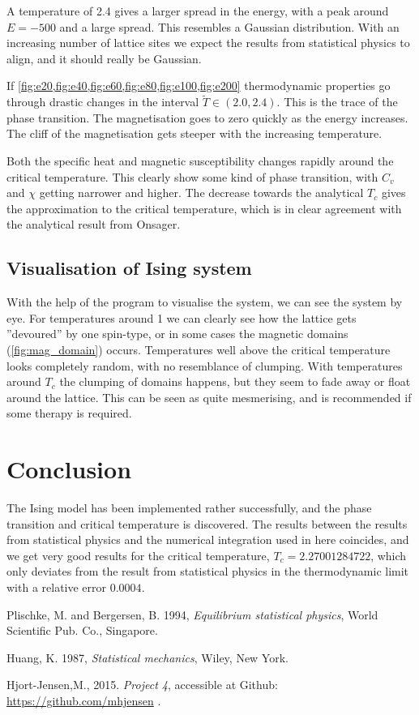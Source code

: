 \documentclass[11pt,a4paper,final]{article}
\numberwithin{equation}{section}
\begin{document}
A temperature of 2.4 gives a larger spread in the energy, with a 
peak around $E = -500$ and a large spread. This resembles a 
Gaussian distribution. With an increasing number of lattice sites 
we expect the results from statistical physics to align, and it should 
really be Gaussian.

If \cref{fig:e20,fig:e40,fig:e60,fig:e80,fig:e100,fig:e200}
thermodynamic properties go through drastic changes in the interval
$\tilde{T}\in (2.0,2.4)$. This is the trace of the phase transition.
The magnetisation goes to zero quickly as the energy increases. The 
cliff of the magnetisation gets steeper with the increasing temperature.

Both the specific heat and magnetic susceptibility changes rapidly 
around the critical temperature. This clearly show some kind of phase
transition, with $C_v$ and $\chi$ getting narrower and higher. The 
decrease towards the analytical $T_c$ gives the approximation to 
the critical temperature, which is in clear agreement with the 
analytical result from Onsager.


\subsection{Visualisation of Ising system}

With the help of the program to visualise the system, we can see the 
system by eye. For temperatures around 1 we can clearly see how the 
lattice gets ''devoured'' by one spin-type, or in some cases the 
magnetic domains (\ref{fig:mag_domain}) occurs. Temperatures well 
above the critical temperature looks completely random, with no 
resemblance of clumping. With temperatures around $T_c$ the clumping 
of domains happens, but they seem to fade away or float around the 
lattice. This can be seen as quite mesmerising, and is recommended 
if some therapy is required.

\section{Conclusion}

The Ising model has been implemented rather successfully, and the 
phase transition and critical temperature is discovered. The results 
between the results from statistical physics and the numerical 
integration used in here coincides, and we get very good results for 
the critical temperature, $T_c = 2.27001284722$, which only deviates 
from the result from statistical physics in the thermodynamic limit
with a relative error $0.0004$.



\begin{thebibliography}{9}
Plischke, M. and Bergersen, B. 1994, \emph{Equilibrium statistical physics}, World Scientific Pub. Co., Singapore.


Huang, K. 1987, \emph{Statistical mechanics}, Wiley, New York. 


Hjort-Jensen,M., 2015. \emph{Project 4}, accessible at Github: 
\url{https://github.com/mhjensen} .

\end{thebibliography}
\end{document}
